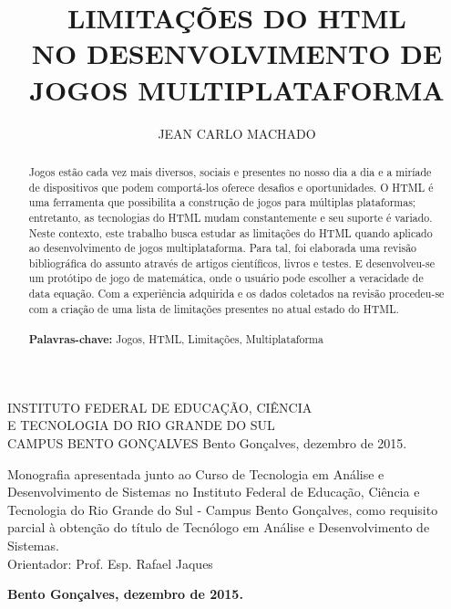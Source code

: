 \documentclass[
12pt,
a4paper,
portuges,
]{report}
\title{\uppercase{Limitações do HTML \\ no desenvolvimento de jogos multiplataforma}}
\author{\uppercase{Jean Carlo Machado}}
\newcommand{\university}{\uppercase{Instituto Federal de Educação, Ciência \\ e Tecnologia do Rio Grande do Sul \\ Campus Bento Gonçalves}}
\newcommand{\locale}{Bento Gonçalves, dezembro de 2015.}
\begin{document}


\begin{titlepage}
    \begin{center}
        {\fontsize{14}{18}\selectfont \university}
        \vfill
        {\fontsize{16}{19}\selectfont \thetitle }
        \vfill
        {\fontsize{12}{15}\selectfont \theauthor}
        \vfill
        {\locale}
    \end{center}
\end{titlepage}


\begin{titlepage}
    \begin{center}
        {\fontsize{14}{18}\selectfont \theauthor}
        \vfill
        {\fontsize{16}{19}\selectfont \thetitle }
        \vfill
        \hfill
        \parbox[s]{8cm}{
        \singlespacing
            Monografia apresentada junto ao Curso
        de Tecnologia em Análise e Desenvolvimento de Sistemas no
    Instituto Federal de Educação, Ciência e Tecnologia do Rio
Grande do Sul - Campus Bento Gonçalves, como requisito parcial à
obtenção do título de Tecnólogo em Análise e Desenvolvimento de Sistemas.
        \\
        Orientador: Prof. Esp. Rafael Jaques
        }
        \vfill
        {\bfseries \locale}
    \end{center}
\end{titlepage}

\onehalfspacing
\renewcommand{\abstractname}{\Large\bfseries RESUMO}
\begin{abstract}
{
Jogos estão cada vez mais diversos, sociais e presentes no nosso dia
a dia e a miríade de dispositivos que podem comportá-los oferece
desafios e oportunidades. O HTML é uma ferramenta que possibilita
a construção de jogos para múltiplas plataformas; entretanto, as
tecnologias do HTML mudam constantemente e seu suporte é variado. Neste
contexto, este trabalho busca estudar as limitações do HTML quando
aplicado ao desenvolvimento de jogos multiplataforma. Para tal, foi
elaborada uma revisão bibliográfica do assunto através de artigos
científicos, livros e testes. E desenvolveu-se um protótipo de jogo
de matemática, onde o usuário pode escolher a veracidade de data
equação. Com a experiência adquirida e os dados coletados na revisão
procedeu-se com a criação de uma lista de limitações presentes no
atual estado do HTML.
}
\\
\\
{\bfseries Palavras-chave:} Jogos, HTML, Limitações,
Multiplataforma
\end{abstract}
\end{document}
